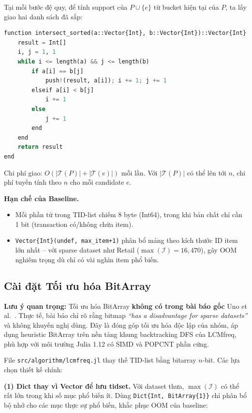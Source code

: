 \documentclass[12pt,a4paper]{article}
\theoremstyle{definition}
\begin{document}
Tại mỗi bước đệ quy, để tính support của $P \cup \{e\}$ từ bucket hiện tại của $P$, ta lấy giao hai danh sách đã sắp:

\begin{lstlisting}[language=Python, caption={Giao hai TID-list sắp xếp để tính T(P cup {e}) (Baseline)}, label=lst:baseline_intersect]
function intersect_sorted(a::Vector{Int}, b::Vector{Int})::Vector{Int}
    result = Int[]
    i, j = 1, 1
    while i <= length(a) && j <= length(b)
        if a[i] == b[j]
            push!(result, a[i]); i += 1; j += 1
        elseif a[i] < b[j]
            i += 1
        else
            j += 1
        end
    end
    return result
end
\end{lstlisting}

Chi phí giao: $O(|\mathcal{T}(P)| + |\mathcal{T}(e)|)$ mỗi lần. Với $|\mathcal{T}(P)|$ có thể lên tới $n$, chi phí tuyến tính theo $n$ cho mỗi candidate $e$.

\textbf{Hạn chế của Baseline.}
\begin{itemize}
    \item Mỗi phần tử trong TID-list chiếm 8 byte (Int64), trong khi bản chất chỉ cần 1 bit (transaction có/không chứa item).
    \item \texttt{Vector\{Int\}(undef, max\_item+1)} phân bổ mảng theo kích thước ID item lớn nhất -- với sparse dataset như Retail ($\max(\mathcal{I}) = 16{,}470$), gây OOM nghiêm trọng dù chỉ có vài nghìn item phổ biến.
\end{itemize}

\subsection{Cài đặt Tối ưu hóa BitArray}

\textbf{Lưu ý quan trọng:} Tối ưu hóa BitArray \textbf{không có trong bài báo gốc} Uno et al.~\cite{uno2004}. Thực tế, bài báo chỉ rõ rằng bitmap \textit{``has a disadvantage for sparse datasets''} và không khuyến nghị dùng. Đây là đóng góp tối ưu hóa độc lập của nhóm, áp dụng heuristic BitArray trên nền tảng khung backtracking DFS của LCMfreq, phù hợp với môi trường Julia 1.12 có SIMD và POPCNT phần cứng.

File \texttt{src/algorithm/lcmfreq.jl} thay thế TID-list bằng \gls{bitarray} $n$-bit. Các lựa chọn thiết kế chính:

\textbf{(1) Dict thay vì Vector để lưu tidset.} Với dataset thưa, $\max(\mathcal{I})$ có thể rất lớn trong khi số mục phổ biến ít. Dùng \texttt{Dict\{Int, BitArray\{1\}\}} chỉ phân bổ bộ nhớ cho các mục thực sự phổ biến, khắc phục OOM của baseline:
\end{document}
